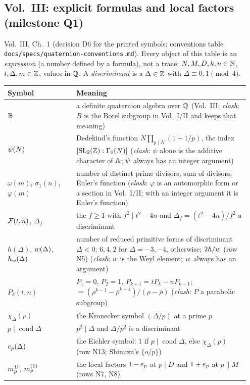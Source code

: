 \subsection*{Vol.~III: explicit formulas and local factors (milestone Q1)}\label{notation:q1}
Vol.~III, Ch.~1 (decision D6 for the printed symbols; conventions table \texttt{docs/specs/quaternion-conventions.md}). Every object of this table is an
\emph{expression} (a number defined by a formula), not a trace; $N,M,D,k,n\in\mathbb{N}$, $t,\Delta,m\in\mathbb{Z}$, values in $\mathbb{Q}$. A \emph{discriminant} is a
$\Delta\in\mathbb{Z}$ with $\Delta\equiv0,1\pmod4$.
\begin{longtable}{@{}p{0.27\linewidth}p{0.68\linewidth}@{}}
\toprule
Symbol & Meaning \\ \midrule
\endhead
$\mathbb{B}$ & a definite quaternion algebra over $\mathbb{Q}$ (Vol.~III; \emph{clash}: $B$ is the Borel subgroup in Vol.~I/II and keeps that meaning) \\
$\psi(N)$ & Dedekind's function $N\prod_{p\mid N}(1+1/p)$, the index $[\mathrm{SL}_2(\mathbb{Z}):\Gamma_0(N)]$ (\emph{clash}: $\psi$ alone is the additive
  character of $\mathbb{A}$; $\psi$ always has an integer argument) \\
$\omega(m)$, $\sigma_1(n)$, $\varphi(m)$ & number of distinct prime divisors; sum of divisors; Euler's function (\emph{clash}: $\varphi$ is an
  automorphic form or a section in Vol.~I/II; with an integer argument it is Euler's function) \\
$\mathcal{F}(t,n)$, $\Delta_f$ & the $f\ge1$ with $f^2\mid t^2-4n$ and $\Delta_f=(t^2-4n)/f^2$ a discriminant \\
$h(\Delta)$, $w(\Delta)$, $h_w(\Delta)$ & number of reduced primitive forms of discriminant $\Delta<0$; $6,4,2$ for $\Delta=-3,-4$, otherwise;
  $2h/w$ (row N5) (\emph{clash}: $w$ is the Weyl element; $w$ always has an argument) \\
$P_k(t,n)$ & $P_1=0$, $P_2=1$, $P_{k+1}=tP_k-nP_{k-1}$; $=(\rho^{k-1}-\bar\rho^{k-1})/(\rho-\bar\rho)$ (\emph{clash}: $P$ a parabolic subgroup) \\
$\chi_\Delta(p)$ & the Kronecker symbol $(\Delta/p)$ at a prime $p$ \\
$p\mid\operatorname{cond}\Delta$ & $p^2\mid\Delta$ and $\Delta/p^2$ is a discriminant \\
$e_p(\Delta)$ & the Eichler symbol: $1$ if $p\mid\operatorname{cond}\Delta$, else $\chi_\Delta(p)$ (row N13; Shimizu's $\{o/p\}$) \\
$m^{D}_p$, $m^{(1)}_p$ & the local factors $1-e_p$ at $p\mid D$ and $1+e_p$ at $p\parallel M$ (rows N7, N8) \\

\end{longtable}
